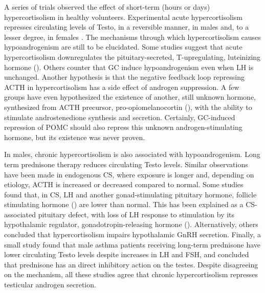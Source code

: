 \documentclass[12pt,english]{report}\usepackage[]{graphicx}\usepackage[]{color}
\begin{document}
A series of trials observed the effect of short-term (hours or days)
hypercortisolism in healthy volunteers. Experimental acute hypercortisolism
represses circulating levels of Testo, in a reversible manner, in
males and, to a lesser degree, in females \citep{cumming1983acute,fassnacht2003adrenal}.
The mechanisms through which hypercortisolism causes hypoandrogenism
are still to be elucidated. Some studies suggest that acute hypercortisolism
downregulates the pituitary-secreted, T-upregulating, luteinizing
hormone ()\citep{kamischke1998testosterone,cortes-gallegos1975effect,kuhn1986fonction}.
Others counter that GC induce hypoandrogenism even when LH is unchanged\citep{schaison1979study}.
Another hypothesis is that the negative feedback loop repressing ACTH
in hypercortisolism has a side effect of androgen suppression\citep{yehuda2004acth}.
A few groups have even hypothesized the existence of another, still
unknown hormone, synthesized from ACTH precursor, pro-opiomelanocortin
(), with the ability to
stimulate androstenedione synthesis and secretion\citep{barbetta2001androgen,cunningham1994dissociation}.
Certainly, GC-induced repression of POMC should also repress this
unknown androgen-stimulating hormone, but its existence was never
proven.

In males, chronic hypercortisolism is also associated with hypoandrogenism.
Long term prednisone therapy reduces circulating Testo levels\citep{martens1994decreased}.
Similar observations have been made in endogenous CS, where exposure
is longer and, depending on etiology, ACTH is increased or decreased
compared to normal. Some studies found that, in CS, LH and another
gonad-stimulating pituitary hormone, follicle stimulating hormone
() are lower than
normal\citep{luton1977reversible}. This has been explained as a CS-associated
pituitary defect, with loss of LH response to stimulation by its hypothalamic
regulator, gonadotropin-releasing hormone ()\citep{luton1977reversible,boccuzzi1975effect}.
Alternatively, others concluded that hypercortisolism impairs hypothalamic
GnRH secretion\citep{lado-abeal1998menstrual}. Finally, a small study
found that male asthma patients receiving long-term prednisone have
lower circulating Testo levels despite increases in LH and FSH, and
concluded that prednisone has an direct inhibitory action on the testes\citep{reid1985plasma}.
Despite disagreeing on the mechanism, all these studies agree that
chronic hypercortisolism represses testicular androgen secretion.
\end{document}
